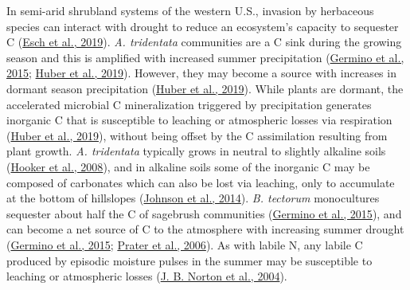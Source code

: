 \documentclass[
  11pt,
  a4paper,
]{article}
\begin{document}
In semi-arid shrubland systems of the western U.S., invasion by herbaceous species can interact with drought to reduce an ecosystem's capacity to sequester C (\protect\hyperlink{ref-Esch2019}{Esch et al., 2019}). \emph{A. tridentata} communities are a C sink during the growing season and this is amplified with increased summer precipitation (\protect\hyperlink{ref-Germino2016}{Germino et al., 2015}; \protect\hyperlink{ref-Huber2019}{Huber et al., 2019}). However, they may become a source with increases in dormant season precipitation (\protect\hyperlink{ref-Huber2019}{Huber et al., 2019}). While plants are dormant, the accelerated microbial C mineralization triggered by precipitation generates inorganic C that is susceptible to leaching or atmospheric losses via respiration (\protect\hyperlink{ref-Huber2019}{Huber et al., 2019}), without being offset by the C assimilation resulting from plant growth. \emph{A. tridentata} typically grows in neutral to slightly alkaline soils (\protect\hyperlink{ref-Hooker2008biogeochem}{Hooker et al., 2008}), and in alkaline soils some of the inorganic C may be composed of carbonates which can also be lost via leaching, only to accumulate at the bottom of hillslopes (\protect\hyperlink{ref-Johnson2014}{Johnson et al., 2014}). \emph{B. tectorum} monocultures sequester about half the C of sagebrush communities (\protect\hyperlink{ref-Germino2016}{Germino et al., 2015}), and can become a net source of C to the atmosphere with increasing summer drought (\protect\hyperlink{ref-Germino2016}{Germino et al., 2015}; \protect\hyperlink{ref-Prater2006}{Prater et al., 2006}). As with labile N, any labile C produced by episodic moisture pulses in the summer may be susceptible to leaching or atmospheric losses (\protect\hyperlink{ref-Norton2004}{J. B. Norton et al., 2004}).
\end{document}
